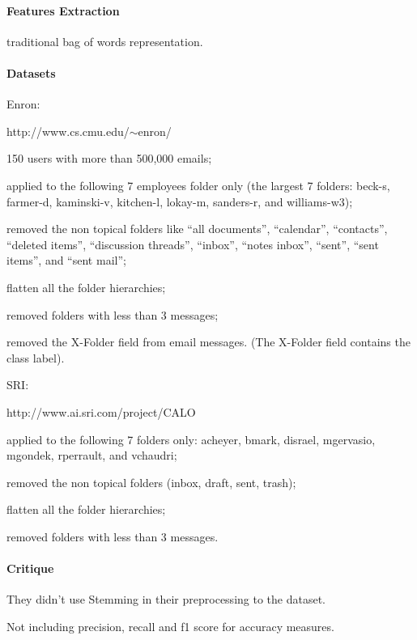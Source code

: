 \documentclass[12pt]{article}
\newenvironment{my_itemize}
{\begin{itemize}
  \setlength{\itemsep}{0cm}
  \setlength{\parskip}{0cm}}
{\end{itemize}}
\begin{document}
\paragraph{Features Extraction}
traditional bag of words representation.


\paragraph{Datasets} 
    \begin{my_itemize}
    \item Enron:
    \begin{my_itemize}
	\item http://www.cs.cmu.edu/$\sim$enron/
        \item 150 users with more than 500,000 emails;
        \item applied to the following 7 employees folder only 
	      (the largest 7 folders: beck-s, farmer-d, kaminski-v, 
	      kitchen-l, lokay-m, sanders-r, and williams-w3);
        \item removed the non topical folders like ``all documents'', 
	      ``calendar'', ``contacts'', ``deleted items'', ``discussion threads'', 
	      ``inbox'', ``notes inbox'', ``sent'', ``sent items'', and ``sent mail'';
        \item flatten all the folder hierarchies;
        \item removed folders with less than 3 messages;
        \item removed the X-Folder field from email messages. (The X-Folder 
	      field contains the class label).
    \end{my_itemize}
    \item SRI:
    \begin{my_itemize}
	\item http://www.ai.sri.com/project/CALO
        \item applied to the following 7 folders only: acheyer, bmark, disrael, 
	      mgervasio, mgondek, rperrault, and vchaudri;
        \item removed the non topical folders (inbox, draft, sent, trash);
        \item flatten all the folder hierarchies;
        \item removed folders with less than 3 messages.
    \end{my_itemize}
\end{my_itemize}

\paragraph{Critique}
\begin{my_itemize}
    \item They didn't use Stemming in their preprocessing to the dataset.
    \item Not including precision, recall and f1 score for accuracy measures.
\end{my_itemize}
\end{document}
